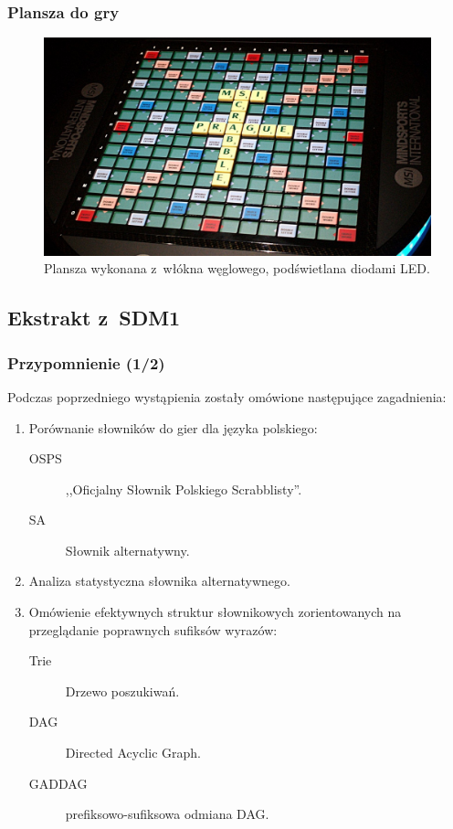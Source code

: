 \documentclass[10pt,a4paper]{beamer}
\begin{document}
\begin{frame}
	\frametitle{Plansza do gry}

	\begin{figure}
		\centering
		\includegraphics[scale=0.17]{graphics/board.jpg}
		\caption{Plansza wykonana z~włókna węglowego, podświetlana diodami LED.}
	\end{figure}
\end{frame}

\subsection{Ekstrakt z~SDM1}

\begin{frame}
	\frametitle{Przypomnienie (1/2)}

	Podczas poprzedniego wystąpienia zostały omówione następujące zagadnienia:

	\begin{enumerate}
		\item Porównanie słowników do gier dla języka polskiego:
			\begin{description}
				\item[OSPS] ,,Oficjalny Słownik Polskiego Scrabblisty''.
				\item[SA] Słownik alternatywny.
			\end{description}
		\item Analiza statystyczna słownika alternatywnego.
		\item Omówienie efektywnych struktur słownikowych zorientowanych na przeglądanie poprawnych sufiksów wyrazów:
			\begin{description}
				\item[Trie] Drzewo poszukiwań.
				\item[DAG] Directed Acyclic Graph.
				\item[GADDAG] prefiksowo-sufiksowa odmiana DAG.
			\end{description}
	\end{enumerate}
\end{frame}
\end{document}
